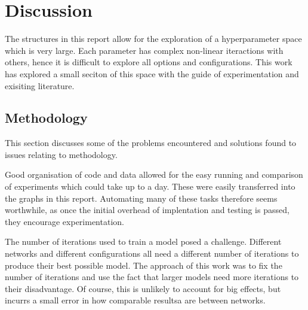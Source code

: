 \chapter{Discussion}
  The structures in this report allow for the exploration of a hyperparameter
  space which is very large. Each parameter has complex non-linear iteractions with
  others, hence it is difficult to explore all options and configurations.
  This work has explored a small seciton of this space with the guide of experimentation
  and exisiting literature.


  \section{Methodology}

    This section discusses some of the problems encountered and solutions found
    to issues relating to methodology.

    Good organisation of code and data allowed for the easy running
    and comparison of experiments which could take up to a day. These were easily transferred
    into the graphs in this report. Automating many of these tasks therefore seems worthwhile,
    as once the initial overhead of implentation and testing is passed, they encourage experimentation.

    The number of iterations used to train a model posed a challenge. Different networks
    and different configurations all need a different number of iterations to produce their
    best possible model. The approach of this work was to fix the number of iterations
    and use the fact that larger models need more iterations to their disadvantage.
    Of course, this is unlikely to account for big effects, but incurrs a small
    error in how comparable resultsa are between networks.

